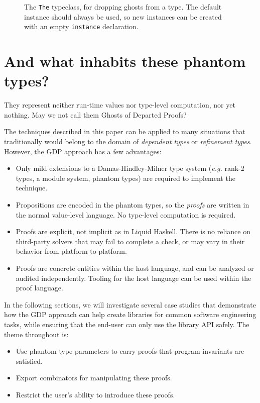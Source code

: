 \documentclass[format=sigplan, review=false, screen=true]{acmart}
\begin{document}
\begin{figure}
  \inputminted{haskell}{theTC.hs}
  \caption{The \texttt{The} typeclass, for dropping ghosts
    from a type. The default instance should always be used,
    so new instances can be created with an empty
    \texttt{instance} declaration.}
\end{figure}

\section{And what inhabits these phantom types?}
They represent neither run-time values nor type-level computation, nor yet nothing.
May we not call them Ghosts of Departed Proofs?

The techniques described in this paper can be applied to many
situations that traditionally would belong to the domain of
\emph{dependent types} or \emph{refinement types}. However, the
GDP approach has a few advantages:
\begin{itemize}
\item Only mild extensions to a Damas-Hindley-Milner type system
  ({\it e.g.} rank-2 types, a module system, phantom types) are required to
  implement the technique.
\item Propositions are encoded in the phantom types, so the
  \emph{proofs} are written in the normal value-level language.
  No type-level computation is required.
\item Proofs are explicit, not implicit as in Liquid Haskell. There is
  no reliance on third-party solvers that may fail to complete a check,
  or may vary in their behavior from platform to platform.
\item Proofs are concrete entities within the host language, and can
  be analyzed or audited independently. Tooling for the host language
  can be used within the proof language.
\end{itemize}

In the following sections, we will investigate several case studies that
demonstrate how the GDP approach can help create libraries for common
software engineering tasks, while ensuring that the end-user can only
use the library API safely. The theme throughout is:
\begin{itemize}
\item Use phantom type parameters to carry proofs that program invariants are satisfied.
\item Export combinators for manipulating these proofs.
\item Restrict the user's ability to introduce these proofs.
\end{itemize}
\end{document}
